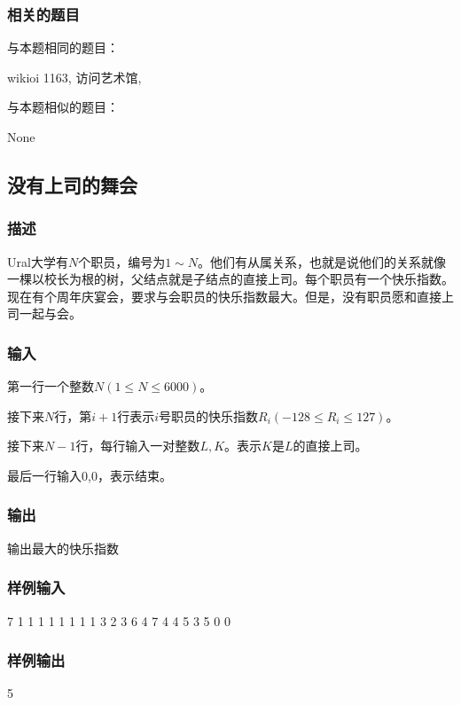 \subsubsection{相关的题目}
与本题相同的题目：
\begindot
\item wikioi 1163, 访问艺术馆, 
\myenddot

与本题相似的题目：
\begindot
\item  None
\myenddot


\subsection{没有上司的舞会}

\subsubsection{描述}
Ural大学有$N$个职员，编号为$1 \sim N$。他们有从属关系，也就是说他们的关系就像一棵以校长为根的树，父结点就是子结点的直接上司。每个职员有一个快乐指数。现在有个周年庆宴会，要求与会职员的快乐指数最大。但是，没有职员愿和直接上司一起与会。

\subsubsection{输入}
第一行一个整数$N(1 \leq N \leq 6000)$。

接下来$N$行，第$i+1$行表示$i$号职员的快乐指数$R_i(-128 \leq R_i \leq 127)$。

接下来$N-1$行，每行输入一对整数$L,K$。表示$K$是$L$的直接上司。

最后一行输入0,0，表示结束。

\subsubsection{输出}
输出最大的快乐指数

\subsubsection{样例输入}
\begin{Code}
7
1
1
1
1
1
1
1
1 3
2 3
6 4
7 4
4 5
3 5
0 0
\end{Code}

\subsubsection{样例输出}
\begin{Code}
5
\end{Code}

